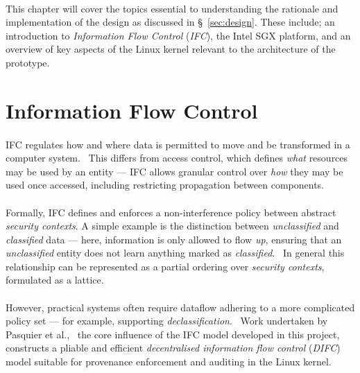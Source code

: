 
\paragraph{} This chapter will cover the topics essential to understanding the rationale and implementation of the design as discussed in §~\ref{sec:design}. These include; an introduction to \textit{Information Flow Control} (\textit{IFC}), the Intel SGX platform, and an overview of key aspects of the Linux kernel relevant to the architecture of the prototype.



\section{Information Flow Control}
\label{sec:ifc}

\paragraph{} IFC regulates how and where data is permitted to move and be transformed in a computer system.~\cite{ifc-data-prop} This differs from access control, which defines \textit{what} resources may be used by an entity --- IFC allows granular control over \textit{how} they may be used once accessed, including restricting propagation between components. 

\paragraph{} Formally, IFC defines and enforces a non-interference policy between abstract \textit{security contexts}. A simple example is the distinction between \textit{unclassified} and \textit{classified} data --- here, information is only allowed to flow \textit{up}, ensuring that an \textit{unclassified} entity does not learn anything marked as \textit{classified}.~\cite{Bell1973SecureCS} In general this relationship can be represented as a partial ordering over \textit{security contexts}, formulated as a lattice.~\cite{ifc-lattice}

\paragraph{} However, practical systems often require dataflow adhering to a more complicated policy set --- for example, supporting \textit{declassification}.~\cite{10.5555/794199.795122} Work undertaken by Pasquier et al.,~\cite{camflow} the core influence of the IFC model developed in this project, constructs a pliable and efficient \textit{decentralised information flow control} (\textit{DIFC}) model suitable for provenance enforcement and auditing in the Linux kernel.

